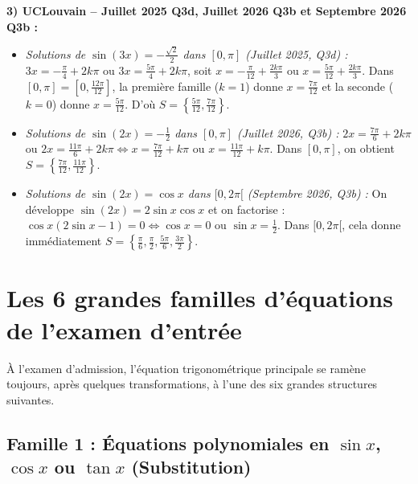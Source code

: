 \begin{exemple}
\medskip
\textbf{3) UCLouvain -- Juillet 2025 Q3d, Juillet 2026 Q3b et Septembre 2026 Q3b :}\\
\begin{itemize}
    \item \emph{Solutions de $\sin(3x) = -\frac{\sqrt{2}}{2}$ dans $[0, \pi]$ (Juillet 2025, Q3d) :} $3x = -\frac{\pi}{4} + 2k\pi$ ou $3x = \frac{5\pi}{4} + 2k\pi$, soit $x = -\frac{\pi}{12} + \frac{2k\pi}{3}$ ou $x = \frac{5\pi}{12} + \frac{2k\pi}{3}$. Dans $[0, \pi] = [0, \frac{12\pi}{12}]$, la première famille ($k=1$) donne $x = \frac{7\pi}{12}$ et la seconde ($k=0$) donne $x = \frac{5\pi}{12}$. D'où $S = \boxed{\left\{\frac{5\pi}{12}, \frac{7\pi}{12}\right\}}$.
    \item \emph{Solutions de $\sin(2x) = -\frac{1}{2}$ dans $[0, \pi]$ (Juillet 2026, Q3b) :} $2x = \frac{7\pi}{6} + 2k\pi$ ou $2x = \frac{11\pi}{6} + 2k\pi \iff x = \frac{7\pi}{12} + k\pi$ ou $x = \frac{11\pi}{12} + k\pi$. Dans $[0, \pi]$, on obtient $S = \boxed{\left\{\frac{7\pi}{12}, \frac{11\pi}{12}\right\}}$.
    \item \emph{Solutions de $\sin(2x) = \cos x$ dans $[0, 2\pi[$ (Septembre 2026, Q3b) :} On développe $\sin(2x) = 2\sin x\cos x$ et on factorise : $\cos x(2\sin x - 1) = 0 \iff \cos x = 0$ ou $\sin x = \frac{1}{2}$. Dans $[0, 2\pi[$, cela donne immédiatement $S = \boxed{\left\{\frac{\pi}{6}, \frac{\pi}{2}, \frac{5\pi}{6}, \frac{3\pi}{2}\right\}}$.
\end{itemize}
\end{exemple}

\section{Les 6 grandes familles d'équations de l'examen d'entrée}

À l'examen d'admission, l'équation trigonométrique principale se ramène toujours, après quelques transformations, à l'une des six grandes structures suivantes.

\subsection{Famille 1 : Équations polynomiales en $\sin x$, $\cos x$ ou $\tan x$ (Substitution)}

